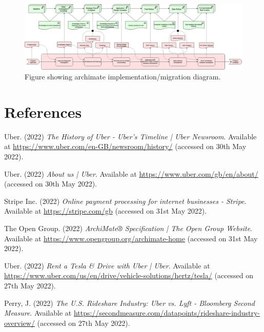 \documentclass{article}
\begin{document}
    \newpage

    \begin{landscape}
      \begin{figure}
        \centering
        \includegraphics[width=20cm]{assets/migration.drawio.png}
        \caption{Figure showing archimate implementation/migration diagram.}
        \label{fig:migrationDiagram}
      \end{figure}
    \end{landscape}

    \newpage
    \section{References}
    \noindent [1] Uber. (2022) \textit{The History of Uber - Uber's Timeline | Uber Newsroom}. Available at \url{https://www.uber.com/en-GB/newsroom/history/} (accessed on 30th May 2022).
    \vspace{0.2cm}

    \noindent [2] Uber. (2022) \textit{About us | Uber}. Available at \url{https://www.uber.com/gb/en/about/} (accessed on 30th May 2022).
    \vspace{0.2cm}

    \noindent [3] Stripe Inc. (2022) \textit{Online payment processing for internet businesses - Stripe}. Available at \url{https://stripe.com/gb} (accessed on 31st May 2022).
    \vspace{0.2cm}

    \noindent [4] The Open Group. (2022) \textit{ArchiMate® Specification | The Open Group Website}. Available at \url{https://www.opengroup.org/archimate-home} (accessed on 31st May 2022).
    \vspace{0.2cm}

    \noindent [5] Uber. (2022) \textit{Rent a Tesla \& Drive with Uber | Uber}. Available at \url{https://www.uber.com/us/en/drive/vehicle-solutions/hertz/tesla/} (accessed on 27th May 2022).
    \vspace{0.2cm}

    \noindent [6] Perry, J. (2022) \textit{The U.S. Rideshare Industry: Uber vs. Lyft - Bloomberg Second Measure}. Available at \url{https://secondmeasure.com/datapoints/rideshare-industry-overview/} (accessed on 27th May 2022).
    \vspace{0.2cm}
\end{document}
